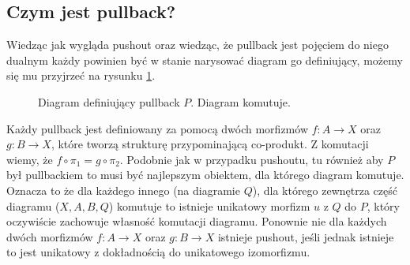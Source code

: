 \subsection{Czym jest pullback?}
Wiedząc jak wygląda pushout oraz wiedząc, że pullback jest pojęciem do niego dualnym każdy powinien być w stanie narysować diagram go definiujący, możemy się mu przyjrzeć na rysunku \ref{fig:pullback_def}.
\begin{figure}[!htp]
    \centering
    \caption{Diagram definiujący pullback $P$. Diagram komutuje.}
    \label{fig:pullback_def}
\end{figure}
Każdy pullback jest definiowany za pomocą dwóch morfizmów $f: A \rightarrow X$ oraz $g: B \rightarrow X$, które tworzą strukturę przypominającą co-produkt. Z komutacji wiemy, że $f \circ \pi_1 = g \circ \pi_2$. Podobnie jak w przypadku pushoutu, tu również aby $P$ był pullbackiem to musi być najlepszym obiektem, dla którego diagram komutuje. Oznacza to że dla każdego innego (na diagramie $Q$), dla którego zewnętrza część diagramu ($X, A, B, Q$) komutuje to istnieje unikatowy morfizm $u$ z $Q$ do $P$, który oczywiście zachowuje własność komutacji diagramu. Ponownie nie dla każdych dwóch morfizmów $f:A \rightarrow X$ oraz $g:B \rightarrow X$ istnieje pushout, jeśli jednak istnieje to jest unikatowy z dokładnością do unikatowego izomorfizmu.
